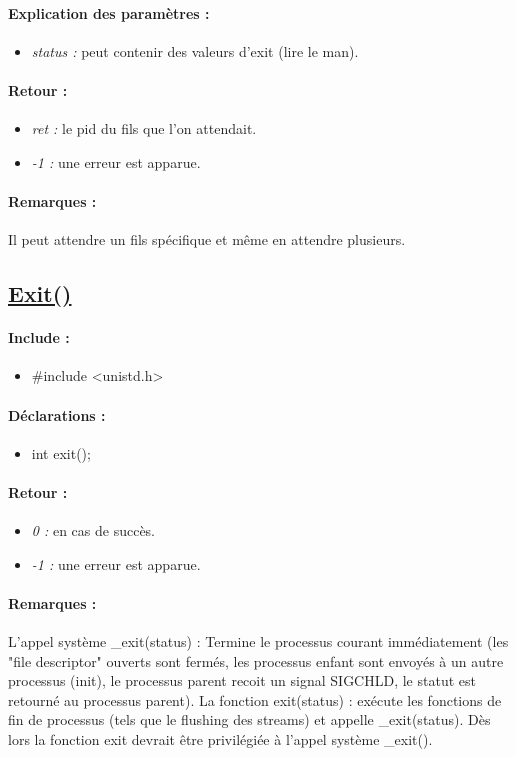 \documentclass{article}[12pt]
\begin{document}
\paragraph{Explication des paramètres : }
\begin{itemize}
	\item \emph{status : } peut contenir des valeurs d'exit (lire le man).
\end{itemize}
\paragraph{Retour : }
\begin{itemize}
	\item \emph{ret : } le pid du fils que l'on attendait.
	\item \emph{-1 : } une erreur est apparue.
\end{itemize}
\paragraph{Remarques : }
Il peut attendre un fils spécifique et même en attendre plusieurs.
\subsection{\href{http://jp.barralis.com/linux-man/man3/exit.3.php}{Exit()}}
\paragraph{Include : }
\begin{itemize}
	\item \#include <unistd.h>
\end{itemize}
\paragraph{Déclarations : }
\begin{itemize}
	\item int exit();
\end{itemize}
\paragraph{Retour : }
\begin{itemize}
	\item \emph{0 : } en cas de succès.
	\item \emph{-1 : } une erreur est apparue.
\end{itemize}
\paragraph{Remarques : }
L'appel système \_exit(status) : Termine le processus courant immédiatement (les "file descriptor" ouverts sont fermés, les processus enfant sont envoyés à un autre processus (init), le processus parent recoit un signal SIGCHLD, le statut est retourné au processus parent).
La fonction exit(status) : exécute les fonctions de fin de processus (tels que le flushing des streams) et appelle \_exit(status).
Dès lors la fonction exit devrait être privilégiée à l'appel système \_exit().
\end{document}
